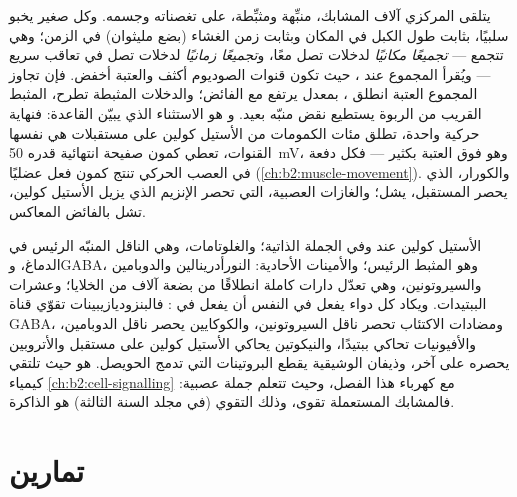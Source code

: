 \begin{proposition}\label{prop:b2:neurons-synapses:integration}
يتلقى  المركزي آلاف المشابك، منبِّهة
ومثبِّطة، على تغصناته وجسمه. وكل 
صغير يخبو سلبيًا، بثابت طول الكبل في
المكان وبثابت زمن الغشاء (بضع مليثوان) في
الزمن؛ وهي تتجمع --- \emph{تجميعًا مكانيًا} لدخلات تصل
معًا، و\emph{تجميعًا زمانيًا} لدخلات تصل في تعاقب
سريع --- ويُقرأ المجموع عند \emph{}، حيث
تكون قنوات الصوديوم أكثف والعتبة أخفض. فإن تجاوز
المجموع العتبة انطلق ، بمعدل يرتفع مع
الفائض؛ والدخلات المثبطة تطرح،  المثبط القريب
من الربوة يستطيع نقض  منبّه بعيد. و
 هو الاستثناء الذي يبيّن القاعدة: فنهاية
حركية واحدة، تطلق مئات الكمومات من الأستيل كولين على
مستقبلات هي نفسها القنوات، تعطي كمون صفيحة انتهائية
قدره \qty{50}{mV}، وهو فوق العتبة بكثير --- فكل دفعة في العصب
الحركي تنتج كمون فعل عضليًا
(\cref{ch:b2:muscle-movement}). والكورار، الذي يحصر المستقبل،
يشل؛ والغازات العصبية، التي تحصر الإنزيم الذي يزيل
الأستيل كولين، تشل بالفائض المعاكس.
\end{proposition}

\begin{example}\label{ex:b2:neurons-synapses:transmitters}
الأستيل كولين عند  وفي الجملة
الذاتية؛ والغلوتامات، وهي الناقل المنبّه الرئيس في الدماغ،
وGABA، وهو المثبط الرئيس؛ والأمينات الأحادية: النورأدرينالين
والدوبامين والسيروتونين، وهي تعدّل دارات كاملة انطلاقًا من بضعة
آلاف من الخلايا؛ وعشرات الببتيدات. ويكاد كل دواء يفعل
في النفس أن يفعل في : فالبنزوديازيبينات تقوّي قناة
GABA، ومضادات الاكتئاب تحصر ناقل السيروتونين، والكوكايين
يحصر ناقل الدوبامين، والأفيونيات تحاكي ببتيدًا، والنيكوتين يحاكي
الأستيل كولين على مستقبل والأتروبين يحصره على آخر،
وذيفان الوشيقية يقطع البروتينات التي تدمج الحويصل. 
هو حيث تلتقي كيمياء \cref{ch:b2:cell-signalling} مع
كهرباء هذا الفصل، وحيث تتعلم جملة عصبية:
فالمشابك المستعملة تقوى، وذلك التقوي (في
مجلد السنة الثالثة) هو الذاكرة.
\end{example}

\section{تمارين}

